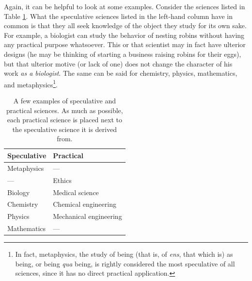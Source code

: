 \documentclass[article,12pt,a4paper,oneside]{memoir}
\begin{document}
    Again, it can be helpful to look at some examples. Consider the
    sciences listed in Table \ref{tab:table1}. What the speculative
    sciences listed in the left-hand column have in common is that they
    all seek knowledge of the object they study for its own sake. For
    example, a biologist can study the behavior of nesting robins
    without having any practical purpose whatsoever. This or that
    scientist may in fact have ulterior designs (he may be thinking of
    starting a business raising robins for their eggs), but that
    ulterior motive (or lack of one) does not change the character of
    his work \emph{as a biologist}. The same can be said for chemistry,
    physics, mathematics, and metaphysics\footnote{In fact, metaphysics,
      the study of being (that is, of \emph{ens}, that which is) as
      being, or being \emph{qua} being, is rightly considered the most
      speculative of all sciences, since it has no direct practical
      application.}.

    \begin{table}[ht]
    \begin{center}
    \caption{A few examples of speculative and practical sciences. As much as possible, each practical science is placed next to the speculative science it is derived from.}
    \label{tab:table1}
    \begin{tabular}{l|l}
    \toprule
    Speculative & Practical \\
    \midrule
    Metaphysics & — \\
    —           & Ethics \\
    Biology     & Medical science \\
    Chemistry   & Chemical engineering \\
    Physics     & Mechanical engineering \\
    Mathematics & — \\
    \bottomrule
    \end{tabular}
    \end{center}
    \end{table}
\end{document}
